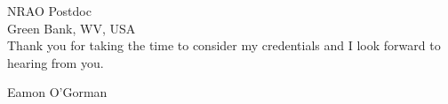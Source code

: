 \documentclass[10pt]{letter} %
\begin{document}
\begin{letter}{NRAO Postdoc \\
Green Bank, WV, USA \\
}
Thank you for taking the time to consider my credentials and I look forward to hearing from you.

Eamon O'Gorman
\\
\\
\\
\\
\\
\\
\\
\\
\end{letter}
 
\end{document}
